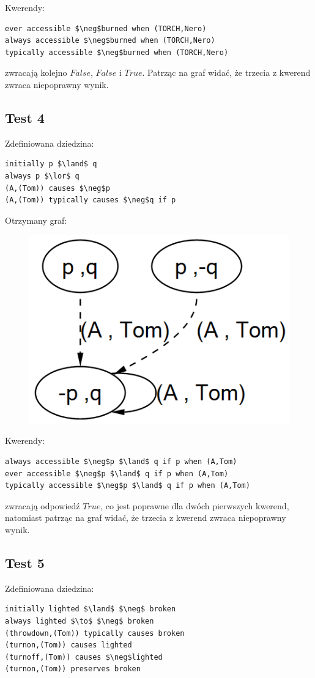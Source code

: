\documentclass{article}
\begin{document}
Kwerendy:
\begin{lstlisting}[mathescape=true]
ever accessible $\neg$burned when (TORCH,Nero)
always accessible $\neg$burned when (TORCH,Nero)
typically accessible $\neg$burned when (TORCH,Nero)
\end{lstlisting}
zwracają kolejno $False$, $False$ i $True$. Patrząc na graf widać, że trzecia z kwerend zwraca niepoprawny wynik.


\subsection{Test 4}
Zdefiniowana dziedzina:
\bigskip
{}
\begin{lstlisting}[mathescape=true]
initially p $\land$ q
always p $\lor$ q 
(A,(Tom)) causes $\neg$p
(A,(Tom)) typically causes $\neg$q if p
\end{lstlisting}
\vspace{1cm}

Otrzymany graf:
\begin{figure}[H]
	\centering
	\includegraphics[scale=0.6]{test4_graf}
\end{figure}

Kwerendy:
\begin{lstlisting}[mathescape=true]
always accessible $\neg$p $\land$ q if p when (A,Tom)
ever accessible $\neg$p $\land$ q if p when (A,Tom)
typically accessible $\neg$p $\land$ q if p when (A,Tom)
\end{lstlisting}
zwracają odpowiedź $True$, co jest poprawne dla dwóch pierwszych kwerend, natomiast patrząc na graf widać, że trzecia z kwerend zwraca niepoprawny wynik.
\newpage

\subsection{Test 5}
Zdefiniowana dziedzina:
\bigskip
{}
\begin{lstlisting}[mathescape=true]
initially lighted $\land$ $\neg$ broken
always lighted $\to$ $\neg$ broken
(throwdown,(Tom)) typically causes broken
(turnon,(Tom)) causes lighted
(turnoff,(Tom)) causes $\neg$lighted
(turnon,(Tom)) preserves broken
\end{lstlisting}
\vspace{1cm}
\end{document}
